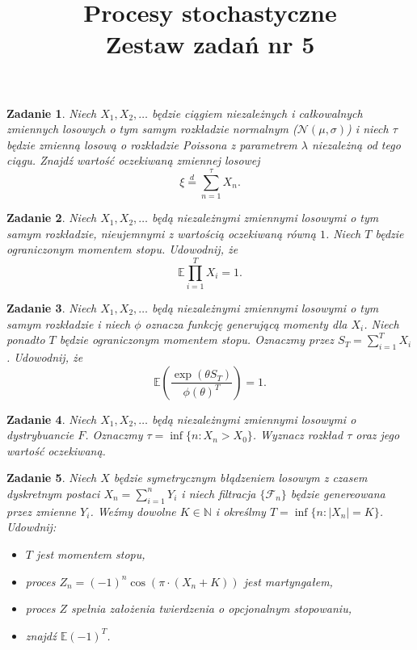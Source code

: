 \documentclass{mwart}
\title{Procesy stochastyczne\\ Zestaw zadań nr 5}
\newtheorem{zd}{Zadanie}
\begin{document}

\maketitle
\begin{zd}
	Niech $X_1, X_2, \dots $ będzie ciągiem niezależnych i całkowalnych zmiennych losowych o tym samym rozkładzie normalnym ($\mathcal{N}(\mu,\sigma)$) i niech $\tau$ będzie zmienną losową o rozkładzie Poissona z parametrem $\lambda$ niezależną od tego ciągu. Znajdź wartość oczekiwaną zmiennej losowej
	\begin{displaymath}
	\xi \stackrel{d}{=} \sum_{n=1}^\tau X_n.
	\end{displaymath}
\end{zd}
\begin{zd}
Niech $X_1, X_2, \dots$ będą niezależnymi zmiennymi losowymi o tym samym rozkładzie, nieujemnymi z wartością oczekiwaną równą $1$. Niech $T$ będzie ograniczonym momentem stopu. Udowodnij, że
\begin{displaymath}
\mathbb{E}\prod_{i=1}^TX_i = 1.
\end{displaymath}
\end{zd}
\begin{zd}
Niech $X_1, X_2, \dots$ będą niezależnymi zmiennymi losowymi o tym samym rozkładzie i niech $\phi$ oznacza funkcję generującą momenty dla $X_i$. Niech ponadto $T$ będzie ograniczonym momentem stopu. Oznaczmy przez $S_T=\sum_{i=1}^TX_i$. Udowodnij, że
\begin{displaymath}
\mathbb{E}\left(\frac{\exp{(\theta S_T)}}{\phi(\theta)^T}\right)=1.
\end{displaymath}
\end{zd}
\begin{zd}
Niech $X_1, X_2, \dots$ będą niezależnymi zmiennymi losowymi o dystrybuancie $F$. Oznaczmy $\tau = \inf\{n: X_n > X_0\}$. Wyznacz rozkład $\tau$ oraz jego wartość oczekiwaną.
\end{zd}
\begin{zd}
Niech $X$ będzie symetrycznym błądzeniem losowym z czasem dyskretnym postaci $X_n = \sum_{i=1}^nY_i$ i niech filtracja $\{\mathcal{F}_n\}$ będzie genereowana przez zmienne $Y_i$. Weźmy dowolne $K\in \mathbb{N}$ i określmy $T = \inf\{n\colon |X_n|=K\}$. Udowdnij:
\begin{itemize}
\item $T$ jest momentem stopu,
\item proces $Z_n = (-1)^n\cos\left(\pi\cdot (X_n+K)\right)$ jest martyngałem,
\item proces $Z$ spełnia założenia twierdzenia o opcjonalnym stopowaniu,
\item znajdź $\mathbb{E}(-1)^T$.
\end{itemize}
\end{zd}
\end{document}
